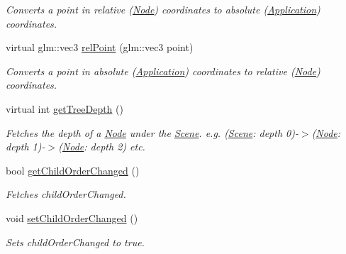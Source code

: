 \begin{DoxyCompactItemize}
\begin{DoxyCompactList}\small\item\em Converts a point in relative (\mbox{\hyperlink{classsage_1_1Node}{Node}}) coordinates to absolute (\mbox{\hyperlink{classsage_1_1Application}{Application}}) coordinates. \end{DoxyCompactList}\item 
virtual glm\+::vec3 \mbox{\hyperlink{classsage_1_1Node_a40edd1724c0956ef7794225fba8353c0}{rel\+Point}} (glm\+::vec3 point)
\begin{DoxyCompactList}\small\item\em Converts a point in absolute (\mbox{\hyperlink{classsage_1_1Application}{Application}}) coordinates to relative (\mbox{\hyperlink{classsage_1_1Node}{Node}}) coordinates. \end{DoxyCompactList}\item 
virtual int \mbox{\hyperlink{classsage_1_1Node_a91e68b6452280bd6d273ff62105a5fe8}{get\+Tree\+Depth}} ()
\begin{DoxyCompactList}\small\item\em Fetches the depth of a \mbox{\hyperlink{classsage_1_1Node}{Node}} under the \mbox{\hyperlink{classsage_1_1Scene}{Scene}}. e.\+g. (\mbox{\hyperlink{classsage_1_1Scene}{Scene}}\+: depth 0)-\/$>$(\mbox{\hyperlink{classsage_1_1Node}{Node}}\+: depth 1)-\/$>$(\mbox{\hyperlink{classsage_1_1Node}{Node}}\+: depth 2) etc. \end{DoxyCompactList}\item 
bool \mbox{\hyperlink{classsage_1_1Node_a983910d41113519eb25d015eac2b4ad0}{get\+Child\+Order\+Changed}} ()
\begin{DoxyCompactList}\small\item\em Fetches child\+Order\+Changed. \end{DoxyCompactList}\item 
void \mbox{\hyperlink{classsage_1_1Node_adaf7f298bffc7e09d6b4dd4f7c7e0e1a}{set\+Child\+Order\+Changed}} ()
\begin{DoxyCompactList}\small\item\em Sets child\+Order\+Changed to true. \end{DoxyCompactList}\end{DoxyCompactItemize}
